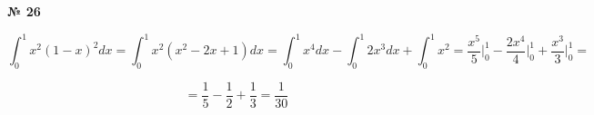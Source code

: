 \documentclass{article}
\begin{document}
\textbf{№ 26} 

$$ \int_{0}^{1} x^2(1-x)^2 dx 
= \int_{0}^{1} x^2(x^2-2x+1) dx 
= \int_{0}^{1} x^4dx - \int_{0}^{1}2x^3dx + \int_{0}^{1}x^2 
= \frac{x^5}{5} \bigg\vert_{0}^{1} - \frac{2x^4}{4} \bigg\vert_{0}^{1} + \frac{x^3}{3} \bigg\vert_{0}^{1} 
= $$

$$ = \frac{1}{5} - \frac{1}{2} + \frac{1}{3}
= \frac{1}{30} $$
\end{document}
